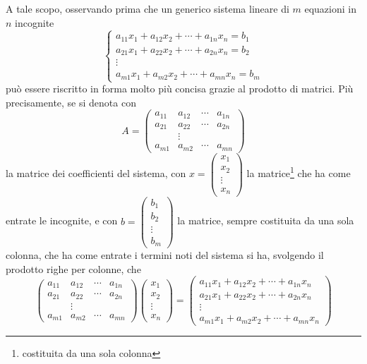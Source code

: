 A tale scopo, osservando prima che un generico sistema lineare di $m$ equazioni in $n$ incognite
\begin{equation}
  \label{eq:Compinveeproddimatrici19}
  \begin{cases}
    a_{11}x_1+a_{12}x_2+\cdots+a_{1n}x_n=b_1\\
    a_{21}x_1+a_{22}x_2+\cdots+a_{2n}x_n=b_2\\
    \vdots\\
    a_{m1}x_1+a_{m2}x_{2}+\cdots+a_{mn}x_n=b_m
  \end{cases}
\end{equation}
può essere riscritto in forma molto più concisa grazie al prodotto di matrici. Più precisamente, se
si denota con
\begin{equation*}
  A=
  \begin{pmatrix}
    a_{11}&a_{12}&\cdots &a_{1n}\\
    a_{21}&a_{22}&\cdots & a_{2n}\\
          & \vdots\\
    a_{m1} & a_{m2} & \cdots & a_{mn}
  \end{pmatrix}
\end{equation*}
la matrice dei coefficienti del sistema, con $x=
\begin{pmatrix}
  x_1\\
  x_2\\
  \vdots\\
  x_n
\end{pmatrix}$ la matrice\footnote{costituita da una sola colonna} che ha come entrate le incognite,
e con $b=
\begin{pmatrix}
  b_1\\
  b_2\\
  \vdots\\
  b_m
\end{pmatrix}$ la matrice, sempre costituita da una sola colonna, che ha come entrate i termini noti del
sistema si ha, svolgendo il prodotto righe per colonne, che
\begin{equation*}
  \begin{pmatrix}
    a_{11} & a_{12} & \cdots & a_{1n}\\
    a_{21} & a_{22} & \cdots & a_{2n}\\
           &\vdots\\
    a_{m1} & a_{m2} & \cdots & a_{mn}
  \end{pmatrix}
  \begin{pmatrix}
    x_1\\
    x_2\\
    \vdots\\
    x_n
  \end{pmatrix}=
  \begin{pmatrix}
     a_{11}x_1+a_{12}x_2+\cdots+a_{1n}x_n\\
    a_{21}x_1+a_{22}x_2+\cdots+a_{2n}x_n\\
    \vdots\\
    a_{m1}x_1+a_{m2}x_{2}+\cdots+a_{mn}x_n
  \end{pmatrix}
\end{equation*}
